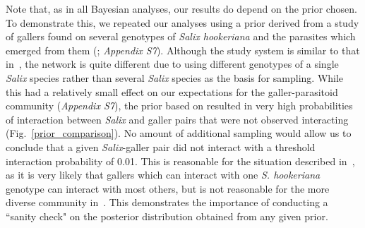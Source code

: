 \documentclass[12pt]{article}
\begin{document}
\begin{spacing}{2.0}
  Note that, as in all Bayesian analyses, our results do depend on the prior chosen. To demonstrate this, we repeated our analyses using a prior derived from a study of gallers found on several genotypes of \emph{Salix hookeriana} and the parasites which emerged from them (\citealp{Barbour2016,Barbour2016Dryad}; \emph{Appendix S7}). Although the study system is similar to that in~\citet{Kopelke2017}, the network is quite different due to using different genotypes of a single \emph{Salix} species rather than several \emph{Salix} species as the basis for sampling. While this had a relatively small effect on our expectations for the galler-parasitoid community (\emph{Appendix S7}), the prior based on \citep{Barbour2016} resulted in very high probabilities of interaction between \emph{Salix} and galler pairs that were not observed interacting (Fig.~\ref{prior_comparison}). No amount of additional sampling would allow us to conclude that a given \emph{Salix}-galler pair did not interact with a threshold interaction probability of 0.01. This is reasonable for the situation described in~\citet{Barbour2016}, as it is very likely that gallers which can interact with one \emph{S. hookeriana} genotype can interact with most others, but is not reasonable for the more diverse community in~\citet{Kopelke2017}. This demonstrates the importance of conducting a ``sanity check" on the posterior distribution obtained from any given prior.





\end{spacing}
\end{document}
